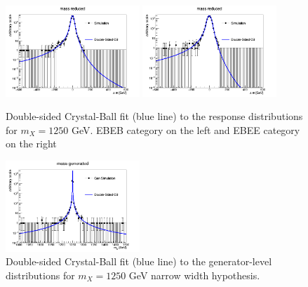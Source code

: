 \begin{figure}[!h]
 \begin{center}
\includegraphics[width=0.45\textwidth]{figures/diphotons/responsefcnfitcbcb_EBEB016_M1250_k001_log.png}
\includegraphics[width=0.45\textwidth]{figures/diphotons/responsefcnfitcbcb_EBEE016_M1250_k001_log.png}
  \caption{Double-sided Crystal-Ball fit (blue line) to the response distributions for $m_X=1250$ GeV. EBEB category on the left and EBEE category on the right}
 \label{fig:fitRes1250}
 \end{center}
\end{figure}
  
\begin{figure}[!h]
 \begin{center}

\includegraphics[width=0.45\textwidth]{figures/diphotons/mgen_cat4_M1250_k001_log.png}
\caption{Double-sided Crystal-Ball fit (blue line) to the generator-level distributions for $m_X=1250$ GeV narrow width hypothesis.}
 \label{fig:bw1250}
 \end{center}
\end{figure}

